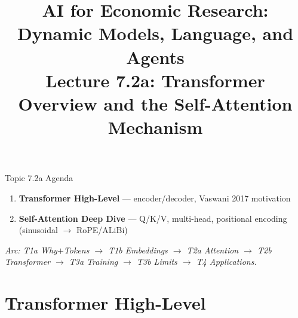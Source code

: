 


\graphicspath{{./pic/}{../../MiniCourse_8hr/Slides/Module3_LLM_Text/pic/}{../}}

\usetikzlibrary{arrows.meta,positioning,shapes,calc,fit,backgrounds}

\title[AI for Econ Research]{AI for Economic Research: Dynamic Models, Language, and Agents\\
Lecture 7.2a: Transformer Overview and the Self-Attention Mechanism}



\makebeamertitle

\begin{frame}{Topic 7.2a Agenda}
\begin{enumerate}
  \item \textbf{Transformer High-Level} --- encoder/decoder, Vaswani 2017 motivation
  \medskip
  \item \textbf{Self-Attention Deep Dive} --- Q/K/V, multi-head, positional encoding (sinusoidal $\to$ RoPE/ALiBi)
\end{enumerate}

\bigskip
\footnotesize\textit{Arc: T1a Why$+$Tokens $\to$ T1b Embeddings $\to$ T2a Attention $\to$ T2b Transformer $\to$ T3a Training $\to$ T3b Limits $\to$ T4 Applications.}
\end{frame}

\section{Transformer High-Level}

